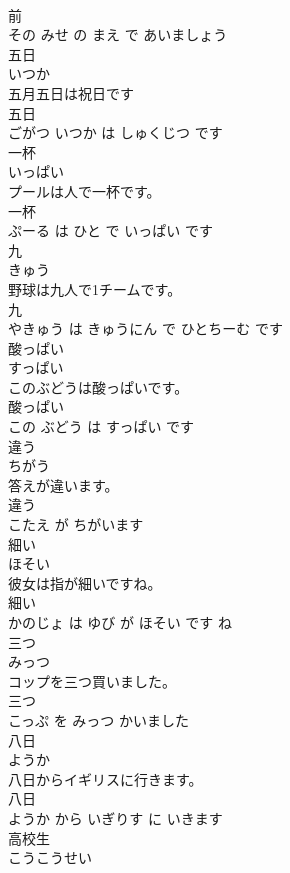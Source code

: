 \documentclass[8pt]{extreport}
\begin{document}
\begin{CJK}{UTF8}{min}
\\	前 
\\	その みせ の まえ で あいましょう			
\\	五日	
\\	いつか			
\\	五月五日は祝日です	
\\	五日 
\\	ごがつ いつか は しゅくじつ です			
\\	一杯	
\\	いっぱい			
\\	プールは人で一杯です。	
\\	一杯 
\\	ぷーる は ひと で いっぱい です			
\\	九	
\\	きゅう			
\\	野球は九人で1チームです。	
\\	九 
\\	やきゅう は きゅうにん で ひとちーむ です			
\\	酸っぱい	
\\	すっぱい			
\\	このぶどうは酸っぱいです。	
\\	酸っぱい 
\\	この ぶどう は すっぱい です			
\\	違う	
\\	ちがう			
\\	答えが違います。	
\\	違う 
\\	こたえ が ちがいます			
\\	細い	
\\	ほそい			
\\	彼女は指が細いですね。	
\\	細い 
\\	かのじょ は ゆび が ほそい です ね			
\\	三つ	
\\	みっつ			
\\	コップを三つ買いました。	
\\	三つ 
\\	こっぷ を みっつ かいました			
\\	八日	
\\	ようか			
\\	八日からイギリスに行きます。	
\\	八日 
\\	ようか から いぎりす に いきます			
\\	高校生	
\\	こうこうせい			

\end{CJK}
\end{document}
